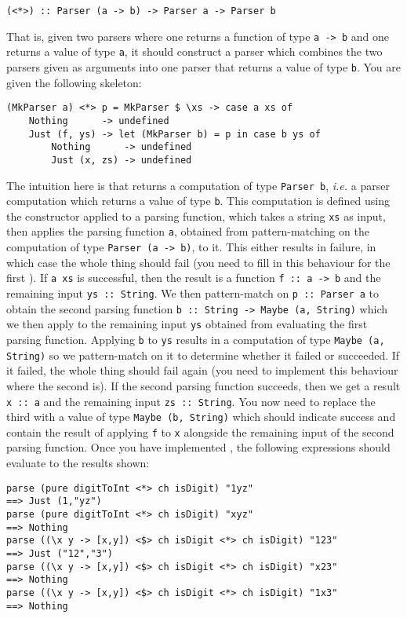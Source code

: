 \begin{verbatim}
(<*>) :: Parser (a -> b) -> Parser a -> Parser b
\end{verbatim}
That is, given two parsers where one returns a function of type \texttt{\small a -> b} and one returns a value of type \texttt{\small a}, it should construct a parser which combines the two parsers given as arguments into one parser that returns a value of type \texttt{\small b}. You are given the following skeleton:
\begin{verbatim}
(MkParser a) <*> p = MkParser $ \xs -> case a xs of
    Nothing      -> undefined
    Just (f, ys) -> let (MkParser b) = p in case b ys of
        Nothing      -> undefined
        Just (x, zs) -> undefined
\end{verbatim}
The intuition here is that \haskellIn{(<*>)} returns a computation of type \texttt{\small Parser b}, \emph{i.e.} a parser computation which returns a value of type \texttt{\small b}. This computation is defined using the  constructor applied to a parsing function, which takes a string \texttt{\small xs} as input, then applies the parsing function \texttt{\small a}, obtained from pattern-matching on the computation of type \texttt{\small Parser (a -> b)}, to it. This either results in failure, in which case the whole thing should fail (you need to fill in this behaviour for the first ). If \texttt{\small a xs} is successful, then the result is a function \texttt{\small f~::~a -> b} and the remaining input \texttt{\small ys~::~String}. We then pattern-match on \texttt{\small p~::~Parser a} to obtain the second parsing function \texttt{\small b~::~String -> Maybe (a, String)} which we then apply to the remaining input \texttt{\small ys} obtained from evaluating the first parsing function. Applying \texttt{\small b} to \texttt{\small ys} results in a computation of type \texttt{\small Maybe (a, String)} so we pattern-match on it to determine whether it failed or succeeded. If it failed, the whole thing should fail again (you need to implement this behaviour where the second  is). If the second parsing function succeeds, then we get a result \texttt{\small x~::~a} and the remaining input \texttt{\small zs~::~String}. You now need to replace the third  with a value of type \texttt{\small Maybe (b, String)} which should indicate success and contain the result of applying \texttt{\small f} to \texttt{\small x} alongside the remaining input of the second parsing function. Once you have implemented \haskellIn{(<*>)}, the following expressions should evaluate to the results shown:
\begin{verbatim}
parse (pure digitToInt <*> ch isDigit) "1yz" 
==> Just (1,"yz")
parse (pure digitToInt <*> ch isDigit) "xyz" 
==> Nothing 
parse ((\x y -> [x,y]) <$> ch isDigit <*> ch isDigit) "123" 
==> Just ("12","3")
parse ((\x y -> [x,y]) <$> ch isDigit <*> ch isDigit) "x23" 
==> Nothing
parse ((\x y -> [x,y]) <$> ch isDigit <*> ch isDigit) "1x3" 
==> Nothing
\end{verbatim}

